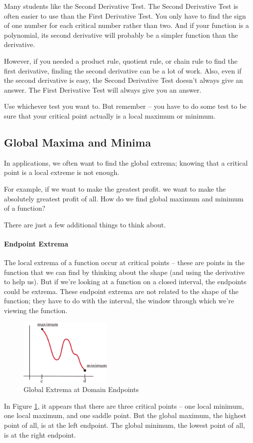 Many students like the Second Derivative Test. The Second Derivative Test is often easier to use than the First Derivative Test. You only have to find the sign of one number for each critical number rather than two. And if your function is a polynomial, its second derivative will probably be a simpler function than the derivative.

However, if you needed a product rule, quotient rule, or chain rule to find the first derivative, finding the second derivative can be a lot of work. Also, even if the second derivative is easy, the Second Derivative Test doesn't always give an answer. The First Derivative Test will always give you an answer.

Use whichever test you want to. But remember -- you have to do some test to be sure that your critical point actually is a local maximum or minimum.

\subsection{Global Maxima and Minima}
In applications, we often want to find the global extrema; knowing that a critical point is a local extreme is not enough.

For example, if we want to make the greatest profit. we want to make the absolutely greatest profit of all. How do we find global maximum and minimum of a function?

There are just a few additional things to think about.

\paragraph*{Endpoint Extrema} 
The local extrema of a function occur at critical points -- these are points in the function that we can find by thinking about the shape (and using the derivative to help us). But if we're looking at a function on a closed interval, the endpoints could be extrema. These endpoint extrema are not related to the shape of the function; they have to do with the interval, the window through which we're viewing the function.

\begin{figure}[!ht]
  \centering
    \includegraphics[width=0.4\textwidth]{img/chap3/image064.png}
    \caption{Global Extrema at Domain Endpoints}
    \label{fig:3-4-globalextrema}
\end{figure}
In Figure \ref{fig:3-4-globalextrema}, it appears that there are three critical points -- one local minimum, one local maximum, and one saddle point. But the global maximum, the highest point of all, is at the left endpoint. The global minimum, the lowest point of all, is at the right endpoint.

